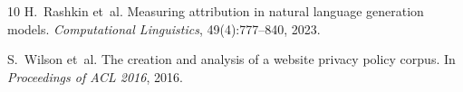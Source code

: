 \documentclass[11pt,a4paper]{article}
\begin{document}
\begin{thebibliography}{10}
H.~Rashkin et~al.
\newblock Measuring attribution in natural language generation models.
\newblock \emph{Computational Linguistics}, 49(4):777--840, 2023.

S.~Wilson et~al.
\newblock The creation and analysis of a website privacy policy corpus.
\newblock In \emph{Proceedings of ACL 2016}, 2016.

\end{thebibliography}
\end{document}
